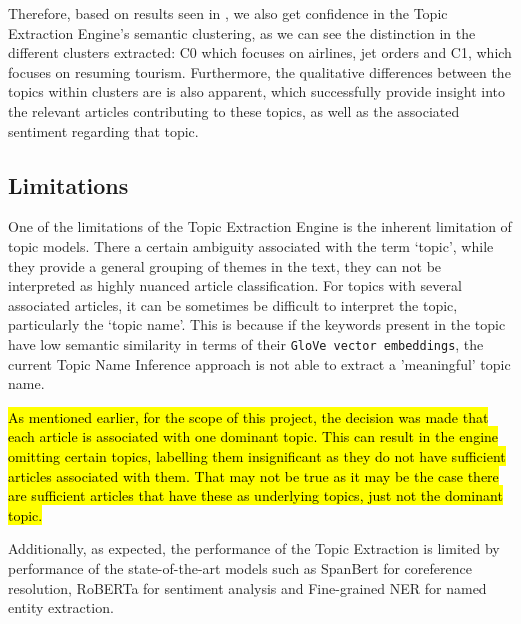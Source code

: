 \vspace{2ex}

Therefore, based on results seen in , we also get confidence in the Topic Extraction Engine's semantic clustering, as we can see the distinction in the different clusters extracted: C0 which focuses on airlines, jet orders and C1, which focuses on resuming tourism.
Furthermore, the qualitative differences between the topics within clusters are is also apparent, which successfully provide insight into the relevant articles contributing to these topics, as well as the associated sentiment regarding that topic.

\subsection{Limitations} \label{limitation_topics}

One of the limitations of the Topic Extraction Engine is the inherent limitation of topic models. There a certain ambiguity associated with the term `topic', while they provide a general grouping of themes in the text, they can not be interpreted as highly nuanced article classification. For topics with several associated articles, it can be sometimes be difficult to interpret the topic, particularly the `topic name'. This is because if the keywords present in the topic have low semantic similarity in terms of their \texttt{GloVe vector embeddings}, the current Topic Name Inference approach is not able to extract a 'meaningful' topic name.

\hl{As mentioned earlier, for the scope of this project, the decision was made that each article is associated with one dominant topic. This can result in the engine omitting certain topics, labelling them insignificant as they do not have sufficient articles associated with them. That may not be true as it may be the case there are sufficient articles that have these as underlying topics, just not the dominant topic.}

Additionally, as expected, the performance of the Topic Extraction is limited by performance of the state-of-the-art models such as SpanBert for coreference resolution, RoBERTa for sentiment analysis and Fine-grained NER for named entity extraction.  